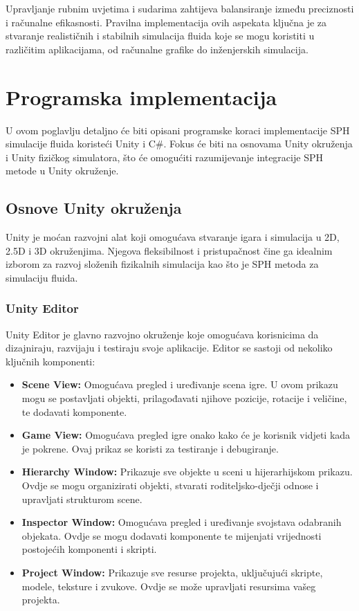 \documentclass[diplomskirad]{fer}
\begin{document}
\begin{itemize}
        Upravljanje rubnim uvjetima i sudarima zahtijeva balansiranje između preciznosti i računalne efikasnosti.
        Pravilna implementacija ovih aspekata ključna je za stvaranje realističnih i stabilnih simulacija fluida koje se mogu koristiti u različitim aplikacijama, od računalne grafike do inženjerskih simulacija.


    \end{itemize}


    \chapter{Programska implementacija}\label{ch:programska-implementacija}

    U ovom poglavlju detaljno će biti opisani programske koraci implementacije SPH simulacije fluida koristeći Unity i C\#.
    Fokus će biti na osnovama Unity okruženja i Unity fizičkog simulatora, što će omogućiti razumijevanje integracije SPH metode u Unity okruženje.


    \section{Osnove Unity okruženja}\label{sec:osnove-unity-okruzenja}

    Unity je moćan razvojni alat koji omogućava stvaranje igara i simulacija u 2D, 2.5D i 3D okruženjima. Njegova fleksibilnost i pristupačnost čine ga idealnim izborom za razvoj složenih fizikalnih simulacija kao što je SPH metoda za simulaciju fluida.

    \subsection{Unity Editor}\label{subsec:unity-editor}
    Unity Editor je glavno razvojno okruženje koje omogućava korisnicima da dizajniraju, razvijaju i testiraju svoje aplikacije.
    Editor se sastoji od nekoliko ključnih komponenti:
    \begin{itemize}
        \item \textbf{Scene View:} Omogućava pregled i uređivanje scena igre.
        U ovom prikazu mogu se postavljati objekti, prilagođavati njihove pozicije, rotacije i veličine, te dodavati komponente.
        \item \textbf{Game View:} Omogućava pregled igre onako kako će je korisnik vidjeti kada je pokrene.
        Ovaj prikaz se koristi za testiranje i debugiranje.
        \item \textbf{Hierarchy Window:} Prikazuje sve objekte u sceni u hijerarhijskom prikazu.
        Ovdje se mogu organizirati objekti, stvarati roditeljsko-dječji odnose i upravljati strukturom scene.
        \item \textbf{Inspector Window:} Omogućava pregled i uređivanje svojstava odabranih objekata.
        Ovdje se mogu dodavati komponente te mijenjati vrijednosti postojećih komponenti i skripti.
        \item \textbf{Project Window:} Prikazuje sve resurse projekta, uključujući skripte, modele, teksture i zvukove.
        Ovdje se može upravljati resursima vašeg projekta.
    \end{itemize}
\end{document}
